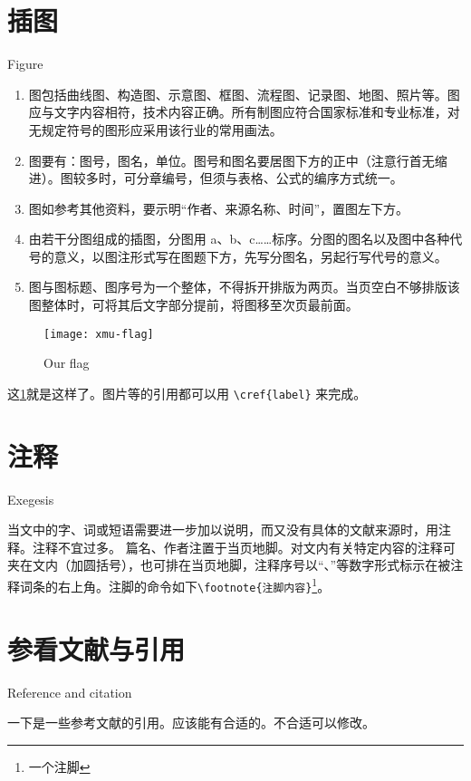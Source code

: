 
\section{插图}{Figure}

\begin{enumerate}
	\item 图包括曲线图、构造图、示意图、框图、流程图、记录图、地图、照片等。图应与文字内容相符，技术内容正确。所有制图应符合国家标准和专业标准，对无规定符号的图形应采用该行业的常用画法。
	\item 图要有：图号，图名，单位。图号和图名要居图下方的正中（注意行首无缩进）。图较多时，可分章编号，但须与表格、公式的编序方式统一。
	\item 图如参考其他资料，要示明“作者、来源名称、时间”，置图左下方。
	\item 由若干分图组成的插图，分图用 a、b、c……标序。分图的图名以及图中各种代号的意义，以图注形式写在图题下方，先写分图名，另起行写代号的意义。
	\item 图与图标题、图序号为一个整体，不得拆开排版为两页。当页空白不够排版该图整体时，可将其后文字部分提前，将图移至次页最前面。
\end{enumerate}

\begin{figure}[h!]
\centering
\texttt{[image: xmu-flag]}
\caption{Our flag} \label{fig11}
\end{figure}

这\cref{fig11}就是这样了。图片等的引用都可以用 \verb|\cref{label}| 来完成。


\section{注释}{Exegesis}

当文中的字、词或短语需要进一步加以说明，而又没有具体的文献来源时，用注释。注释不宜过多。
篇名、作者注置于当页地脚。对文内有关特定内容的注释可夹在文内（加圆括号），也可排在当页地脚，注释序号以“、”等数字形式标示在被注释词条的右上角。注脚的命令如下\verb|\footnote{注脚内容}|\footnote{一个注脚}。

\section{参看文献与引用}{Reference and citation}

一下是一些参考文献的引用。应该能有合适的。不合适可以修改。


\cite{刘海洋2013latex,CTEX}

\cite{XMU}

\citet{刘海洋2013latex}

\citep{刘海洋2013latex}

\citealt{刘海洋2013latex}

\citeauthor{刘海洋2013latex}

\citeyearpar{刘海洋2013latex}
